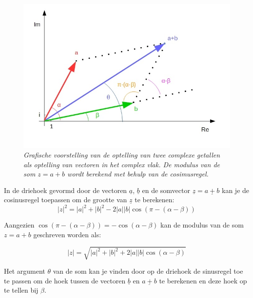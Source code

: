 \begin{figure}[h]
	\begin{center}
		\includegraphics[scale=0.6]{3_gonio_complexe_getallen/inputs/complex-getal-6-optelling-exp.jpg}
	\end{center}
	\caption{\it Grafische voorstelling van de optelling van twee complexe getallen als optelling van vectoren in het complex vlak. De modulus van de som $z=a+b$ wordt berekend met behulp van de cosimusregel.}
\end{figure}

In de driehoek gevormd door de vectoren $\underline{a}$, $\underline{b}$ en de somvector $\underline{z}=\underline{a+b}$ kan je de cosinusregel toepassen om de grootte van $\underline{z}$ te berekenen:\\

\[ |z|^2 =|a|^2 +|b|^2 -2|a||b|\cos(\pi-(\alpha-\beta))  \]

Aangezien $\cos(\pi-(\alpha-\beta))=-\cos(\alpha-\beta)$ kan de modulus van de som $z=a+b$ geschreven worden als:\\

\begin{framed}
	\[ |z|=\sqrt{|a|^2 +|b|^2 +2|a||b|\cos(\alpha-\beta)} \]
\end{framed}

Het argument $\theta$ van de som  kan je vinden door op de driehoek de sinusregel toe te passen om de hoek tussen de vectoren $\underline{b}$ en $\underline{a+b}$ te berekenen en deze hoek op te tellen bij $\beta$.\\

\vspace{0.2cm}

